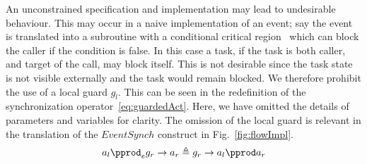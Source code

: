 An unconstrained specification and implementation may lead to undesirable behaviour. This may occur in a naive implementation of an event; say the event is translated into a subroutine with a conditional critical region~\cite{Hansen72} which can block the caller if the condition is false. In this case a task, if the task is both caller, and target of the call, may block itself. This is not desirable since the task state is not visible externally and the task would remain blocked. We therefore prohibit the use of a local guard $g_l$. This can be seen in the redefinition of the synchronization operator~\eqref{eq:guardedAct}. Here, we have omitted the details of parameters and variables for clarity. The omission of the local guard is relevant in the translation of the $EventSynch$ construct in Fig.~\ref{fig:flowImpl}.
%
\begin{equation}
a_l \pprod_e g_r \rightarrow a_r\triangleq g_r \rightarrow a_l \pprod a_r
\label{eq:guardedAct}
\end{equation}

